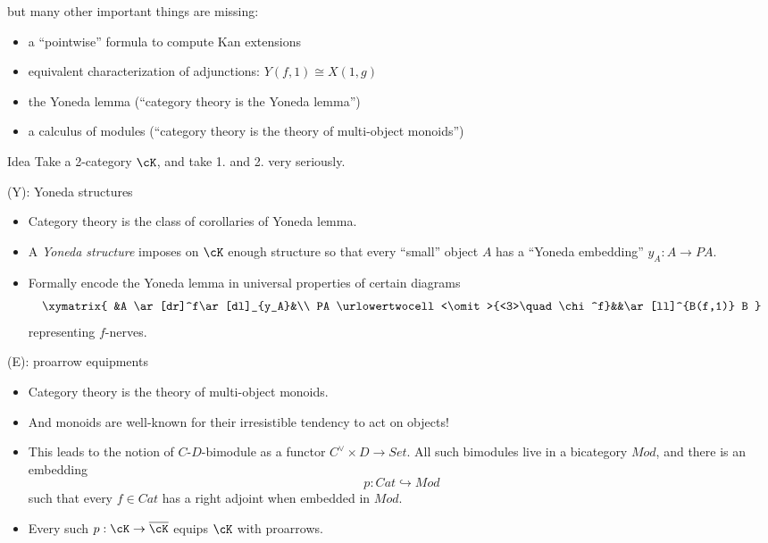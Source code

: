 \documentclass{beamer}
\begin{document}
\begin{frame}
	but many other important things are missing:
	\bigskip\onslide<2->
	\begin{itemize}
		\item a ``pointwise'' formula to compute Kan extensions
		\item equivalent characterization of adjunctions: $Y(f,1)\cong X(1,g)$
		\item[Y)] the \alert{Yoneda lemma} (``category theory is the Yoneda lemma'')
		\item[E)] a \alert{calculus of modules} (``category theory is the theory of multi-object monoids'')
	\end{itemize}
	\begin{block}{Idea}
		Take a 2-category $\cK$, and take 1. and 2. very seriously.
	\end{block}
\end{frame}
\begin{frame}
	\begin{block}{(Y): Yoneda structures}
		\begin{itemize}
			\item<1-> Category theory is the class of corollaries of Yoneda lemma.
			\item<2-> A \emph{Yoneda structure} imposes on $\cK$ enough structure so that every ``small'' object $A$ has a ``Yoneda embedding'' $y_A : A\to PA$.
			\item<3-> Formally encode the Yoneda lemma in universal properties of certain diagrams
			      \[
				      \xymatrix{
					      &A \ar[dr]^f\ar[dl]_{y_A}&\\
					      PA \urlowertwocell<\omit>{<3>\quad\chi^f}&&\ar[ll]^{B(f,1)} B
				      }
			      \]
			      representing \alert{$f$-nerves}.
		\end{itemize}
	\end{block}
\end{frame}
\begin{frame}
	\begin{block}{(E): proarrow equipments}
		\begin{itemize}
			\item<1-> Category theory is the theory of multi-object monoids.
			\item<2-> And monoids are well-known for their irresistible tendency to act on objects!
			\item<3-> This leads to the notion of \alert{$C$-$D$-bimodule} as a functor $C^\lor\times D\to Set$. All such bimodules live in a bicategory $Mod$, and there is an embedding \[p : Cat \hookrightarrow Mod\] such that every $f\in Cat$ has a right adjoint when embedded in $Mod$.
			\item<4-> Every such $p : \cK \to \overline{\cK}$ \alert{equips $\cK$ with proarrows}.
		\end{itemize}
	\end{block}
\end{frame}
\end{document}
